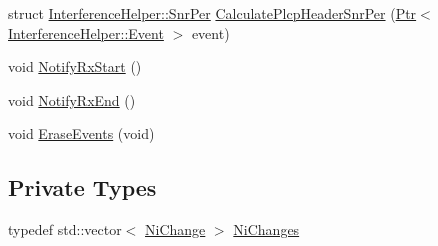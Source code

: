 \begin{DoxyCompactItemize}
\item 
struct \hyperlink{structns3_1_1InterferenceHelper_1_1SnrPer}{Interference\+Helper\+::\+Snr\+Per} \hyperlink{classns3_1_1InterferenceHelper_aba890dc2d1951f89e3bc0d33a9c649a3}{Calculate\+Plcp\+Header\+Snr\+Per} (\hyperlink{classns3_1_1Ptr}{Ptr}$<$ \hyperlink{classns3_1_1InterferenceHelper_1_1Event}{Interference\+Helper\+::\+Event} $>$ event)
\item 
void \hyperlink{classns3_1_1InterferenceHelper_a881195405f028805df1890088735e0f3}{Notify\+Rx\+Start} ()
\item 
void \hyperlink{classns3_1_1InterferenceHelper_a4b45bac60d8b7c412236794cf393945d}{Notify\+Rx\+End} ()
\item 
void \hyperlink{classns3_1_1InterferenceHelper_a30aa5b4b44ef28dd034c124b32dd8ed1}{Erase\+Events} (void)
\end{DoxyCompactItemize}
\subsection*{Private Types}
\begin{DoxyCompactItemize}
\item 
typedef std\+::vector$<$ \hyperlink{classns3_1_1InterferenceHelper_1_1NiChange}{Ni\+Change} $>$ \hyperlink{classns3_1_1InterferenceHelper_ac32f50ca00a8e76bb133230d27cce2a9}{Ni\+Changes}
\end{DoxyCompactItemize}
